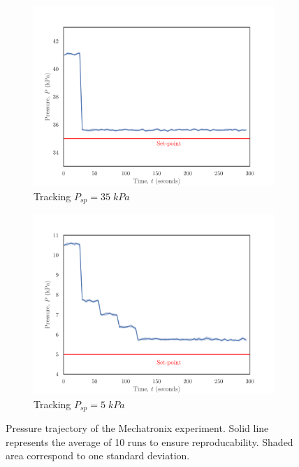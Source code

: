 \begin{figure}[H]
     \centering
     \begin{subfigure}{0.49\textwidth}
         \centering
         \includegraphics[width=\textwidth]{images/ch4/35SP_normal.pdf}
         \caption{Tracking $P_{sp} = 35 \; kPa$}
         \label{fig:system1_highsp}
     \end{subfigure}
     \hfill
     \begin{subfigure}{0.49\textwidth}
         \centering
         \includegraphics[width=\textwidth]{images/ch4/5SP_normal.pdf}
         \caption{Tracking $P_{sp} = 5 \; kPa$}
         \label{fig:system1_lowsp}
     \end{subfigure}
     \caption{Pressure trajectory of the Mechatronix experiment.  Solid line represents the average of 10 runs to ensure reproducability. Shaded area correspond to one standard deviation.}
\end{figure}

